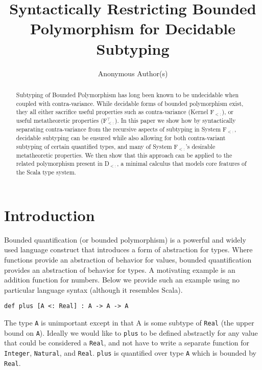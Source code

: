 \documentclass[runningheads, anon]{llncs}
\begin{document}
%
\title{Syntactically Restricting Bounded Polymorphism for Decidable Subtyping}
%
%
\author{Anonymous Author(s)}
%
%
%
\maketitle              %
%
\begin{abstract}
Subtyping of Bounded Polymorphism has long been known
to be undecidable when coupled with contra-variance. While decidable forms of bounded polymorphism exist, they all either sacrifice useful properties such as contra-variance 
(Kernel F$_{<:}$), or 
useful metatheoretic properties (F$_{<:}^\top$).
In this paper we show how by syntactically separating contra-variance from 
the recursive aspects of subtyping in System F$_{<:}$, decidable subtyping can be ensured while also allowing for both contra-variant subtyping
of certain quantified types, and many of System F$_{<:}$'s desirable metatheoretic properties. We then show that this approach can be applied to the related polymorphism present in D$_{<:}$, a minimal calculus that models core features of the Scala type system.

\end{abstract}

\section{Introduction}
\label{s:intro}

Bounded quantification (or bounded polymorphism) is a powerful and widely used language construct that introduces a form of 
abstraction for types. Where functions provide an abstraction of behavior for values, bounded quantification 
provides an abstraction of behavior for types. A motivating example is an addition function for numbers. Below we
provide such an example using no particular language syntax (although it resembles Scala).
\begin{lstlisting}[mathescape, style=custom_lang]
def plus [A <: Real] : A -> A -> A
\end{lstlisting}
The type \verb|A| is unimportant except in that A is some subtype of \verb|Real| (the upper bound on \verb|A|). Ideally we would like to 
\verb|plus| to be defined abstractly for any value that could be considered a \verb|Real|, and not have to write 
a separate function for \verb|Integer|, \verb|Natural|, and \verb|Real|. \verb|plus| is  quantified over type \verb|A| which is 
bounded by \verb|Real|.
\end{document}
